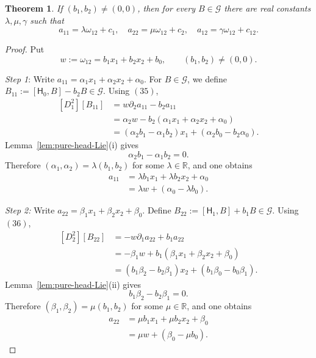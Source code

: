 \documentclass[11pt,a4paper]{article}
\numberwithin{equation}{section}
\theoremstyle{journalplain}
\newtheorem{theorem}{Theorem}[section]
\theoremstyle{journaldef}
\begin{document}
\begin{theorem}\label{prop:G-parallel}
If $(b_1,b_2)\ne(0,0)$, then for every $B\in\mathcal G$ there are real
constants $\lambda,\mu,\gamma$ such that
\begin{equation}
a_{11}=\lambda\omega_{12}+c_1,
\quad a_{22}=\mu\omega_{12}+c_2,
\quad a_{12}=\gamma\omega_{12}+c_{12}.
\label{eq:G-parallel}
\end{equation}
\end{theorem}

\begin{tcolorbox}[
  enhanced,
  breakable,
  title={Proof of Theorem~\ref{prop:G-parallel}}
]
\begin{proof}
Put
\[
w:=\omega_{12}=b_1x_1+b_2x_2+b_0,
\qquad
(b_1,b_2)\ne(0,0).
\tag{30}
\]

\emph{Step 1}: Write
\(
a_{11}
=
\alpha_1x_1+\alpha_2x_2+\alpha_0.
\)
For $B \in \mathcal G$, we define
\(
B_{11}
:=
[\mathsf H_0,B]-b_2B \in \mathcal G.
\)
Using \((35)\),
\[
\begin{aligned}
[D_1^2][B_{11}]
&=
w\partial_2a_{11}-b_2a_{11}\\
&=
\alpha_2w
-b_2(\alpha_1x_1+\alpha_2x_2+\alpha_0)\\
&=
(\alpha_2b_1-\alpha_1b_2)x_1
+
(\alpha_2b_0-b_2\alpha_0).
\end{aligned}
\]
Lemma~\ref{lem:pure-head-Lie}\textup{(i)} gives
\[
\alpha_2b_1-\alpha_1b_2=0.
\]
Therefore
\(
(\alpha_1,\alpha_2)
=
\lambda(b_1,b_2)
\)
for some \(\lambda\in\mathbb R\), and one obtains
\[
\begin{aligned}
a_{11}
&=
\lambda b_1x_1+\lambda b_2x_2+\alpha_0\\
&=
\lambda w+(\alpha_0-\lambda b_0).
\end{aligned}
\]


\emph{Step 2:} Write
\(
a_{22}
=
\beta_1x_1+\beta_2x_2+\beta_0.
\)
Define
\(
B_{22}
:=
[\mathsf H_1,B]+b_1B \in \mathcal G.
\)
Using \((36)\),
\[
\begin{aligned}
[D_2^2][B_{22}]
&=
-w\partial_1a_{22}+b_1a_{22}\\
&=
-\beta_1w
+b_1(\beta_1x_1+\beta_2x_2+\beta_0)\\
&=
(b_1\beta_2-b_2\beta_1)x_2
+
(b_1\beta_0-b_0\beta_1).
\end{aligned}
\]
Lemma~\ref{lem:pure-head-Lie}\textup{(ii)} gives
\[
b_1\beta_2-b_2\beta_1=0.
\]
Therefore
\(
(\beta_1,\beta_2)
=
\mu(b_1,b_2)
\)
for some \(\mu\in\mathbb R\), and one obtains
\[
\begin{aligned}
a_{22}
&=
\mu b_1x_1+\mu b_2x_2+\beta_0\\
&=
\mu w+(\beta_0-\mu b_0).
\end{aligned}
\]



\end{proof}
\end{tcolorbox}
\end{document}

